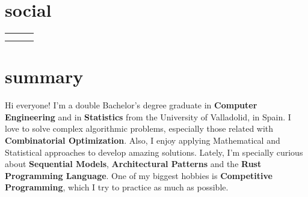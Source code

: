 \documentclass{friggeri-cv}
\newcommand{\myhref}[2]{\href[pdfnewwindow=true]{#1}{#2}}
\begin{document}


  \section{social}

    \vspace{-1.5em}
    \begin{center}
      \renewcommand{\arraystretch}{1.5}
      \begin{tabular}{ p{16em} p{17em} p{16em} }
        \myhref{https://garciparedes.me}{\faHome\quad Website: garciparedes.me}
        &
        \myhref{mailto:sergio@garciparedes.me}{\faEnvelope\quad Email: sergio@garciparedes.me}
        &
        \myhref{https://es.linkedin.com/in/garciparedes/en}{\faLinkedin\quad LinkedIn: Sergio García Prado}
        \\

        \myhref{https://github.com/garciparedes}{\faGithub\quad GitHub: @garciparedes}
        &
        \myhref{https://scholar.google.es/citations?user=X3Mb7BAAAAAJ}{\faGraduationCap\quad Scholar: Sergio García Prado}
        &
        \myhref{https://stackoverflow.com/users/3921457/garciparedes}{\faStackOverflow\quad StackOverflow: @garciparedes}
        \\
      \end{tabular}
    \end{center}




  \section{summary}

  Hi everyone! I'm a double Bachelor's degree graduate in \textbf{Computer Engineering} and in \textbf{Statistics} from the University of Valladolid, in Spain. I love to solve complex algorithmic problems, especially those related with \textbf{Combinatorial Optimization}. Also, I enjoy applying Mathematical and Statistical approaches to develop amazing solutions. Lately, I'm specially curious about \textbf{Sequential Models}, \textbf{Architectural Patterns} and the \textbf{Rust Programming Language}. One of my biggest hobbies is \textbf{Competitive Programming}, which I try to practice as much as possible.
\end{document}
